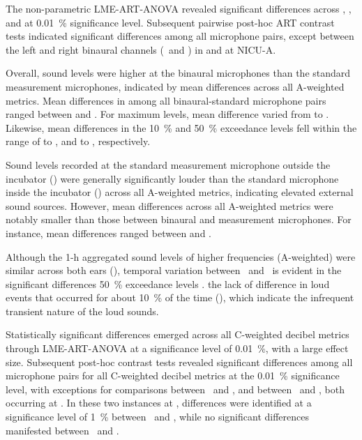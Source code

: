 The non-parametric LME-ART-ANOVA revealed significant differences across , ,  and  at \SI{0.01}{\percent} significance level. Subsequent pairwise post-hoc ART contrast tests indicated significant differences among all microphone pairs, except between the left and right binaural channels (\binL\ and \binR) in  and  at NICU-A.  

Overall, sound levels were higher at the binaural microphones than the standard measurement microphones, indicated by mean differences across all A-weighted metrics. Mean differences in  among all binaural-standard microphone pairs ranged between  and  \dba{}. For maximum levels, mean difference varied from  to  \dba{}. Likewise, mean differences in the \SI{10}{\percent} and \SI{50}{\percent} exceedance levels fell within the range of  to  \dba{}, and  to  \dba{}, respectively.

Sound levels recorded at the standard measurement microphone outside the incubator (\GRASOut) were generally significantly louder than the standard microphone inside the incubator (\GRASIn) across all A-weighted metrics,  indicating elevated external sound sources. However, mean differences across all A-weighted metrics were notably smaller than those between binaural and measurement microphones. For instance, mean differences ranged between  and  \dba{}.

Although the 1-h aggregated sound levels of higher frequencies (A-weighted) were similar across both ears (), temporal variation between \binL\ and \binR\ is evident in the significant differences \SI{50}{\percent} exceedance levels  \dba{}.  the lack of difference in loud events that occurred for about \SI{10}{\percent} of the time (), which indicate the infrequent transient nature of the loud sounds.

Statistically significant differences emerged across all C-weighted decibel metrics through LME-ART-ANOVA at a significance level of \SI{0.01}{\percent}, with a large effect size. Subsequent post-hoc contrast tests revealed significant differences among all microphone pairs for all C-weighted decibel metrics at the \SI{0.01}{\percent} significance level, with exceptions for comparisons between \binL\ and \binR, and between \GRASOut\ and \binR, both occurring at . In these two instances at , differences were identified at a significance level of \SI{1}{\percent} between \binL\ and \binR, while no significant differences manifested between \GRASOut\ and \binR. 

